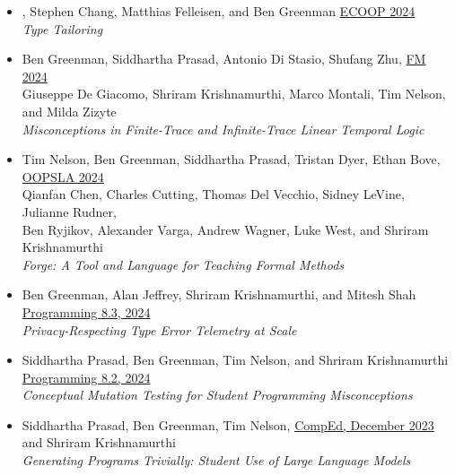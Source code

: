 \documentclass[11pt]{article}
\begin{document}
\begin{itemize}
\item
  , Stephen Chang, Matthias Felleisen, and Ben Greenman \hfill \href{https://2024.ecoop.org/}{ECOOP 2024} \\
    \emph{Type Tailoring} \hfill {}
\item
  Ben Greenman, Siddhartha Prasad, Antonio Di Stasio, Shufang Zhu, \hfill \href{https://www.fm24.polimi.it/}{FM 2024} \\
  Giuseppe De Giacomo, Shriram Krishnamurthi, Marco Montali, Tim Nelson, and Milda Zizyte \\
    \emph{Misconceptions in Finite-Trace and Infinite-Trace Linear Temporal Logic} \hfill {}
\item
  {Tim Nelson}, {Ben Greenman}, {Siddhartha Prasad}, {Tristan Dyer}, {Ethan Bove},
    \hfill \href{https://2024.splashcon.org/track/splash-2024-oopsla}{OOPSLA 2024} \\
  {Qianfan Chen}, {Charles Cutting}, {Thomas Del Vecchio}, {Sidney LeVine}, {Julianne Rudner}, \\
  {Ben Ryjikov}, {Alexander Varga}, {Andrew Wagner}, {Luke West}, and {Shriram Krishnamurthi} \\
    \emph{Forge: A Tool and Language for Teaching Formal Methods} \hfill {} %
\item
  Ben Greenman, Alan Jeffrey, Shriram Krishnamurthi, and Mitesh Shah \hfill \href{https://2024.programming-conference.org/}{Programming 8.3, 2024} \\
  \emph{Privacy-Respecting Type Error Telemetry at Scale} \hfill {}
\item
  Siddhartha Prasad, Ben Greenman, Tim Nelson, and Shriram Krishnamurthi \hfill \href{https://2024.programming-conference.org/}{Programming 8.2, 2024} \\
  \emph{Conceptual Mutation Testing for Student Programming Misconceptions} \hfill {}
\item
  Siddhartha Prasad, Ben Greenman, Tim Nelson, \hfill \href{https://comped.acm.org/call-for-participation-2/}{CompEd, December 2023} \\
      and Shriram Krishnamurthi \\
    \emph{Generating Programs Trivially: Student Use of Large Language Models} \hfill {}

\end{itemize}
\end{document}
